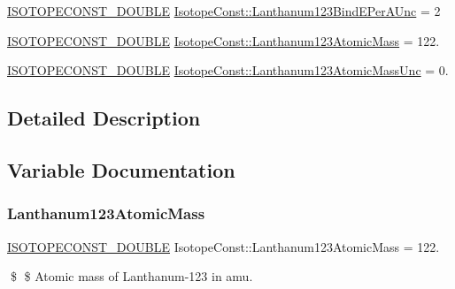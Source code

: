 \begin{DoxyCompactItemize}
\mbox{\hyperlink{group___isotope_const-_macros_ga8f45a7272ce02c0b4c65c44636ed719a}{I\+S\+O\+T\+O\+P\+E\+C\+O\+N\+S\+T\+\_\+\+D\+O\+U\+B\+LE}} \mbox{\hyperlink{group___isotope_const-_lanthanum-_la123_ga6f1ca393a390d6d6db7901b2883a7c80}{Isotope\+Const\+::\+Lanthanum123\+Bind\+E\+Per\+A\+Unc}} = 2
\item 
\mbox{\hyperlink{group___isotope_const-_macros_ga8f45a7272ce02c0b4c65c44636ed719a}{I\+S\+O\+T\+O\+P\+E\+C\+O\+N\+S\+T\+\_\+\+D\+O\+U\+B\+LE}} \mbox{\hyperlink{group___isotope_const-_lanthanum-_la123_ga54efb7b894d6e23eda2ad7463dfd226c}{Isotope\+Const\+::\+Lanthanum123\+Atomic\+Mass}} = 122.
\item 
\mbox{\hyperlink{group___isotope_const-_macros_ga8f45a7272ce02c0b4c65c44636ed719a}{I\+S\+O\+T\+O\+P\+E\+C\+O\+N\+S\+T\+\_\+\+D\+O\+U\+B\+LE}} \mbox{\hyperlink{group___isotope_const-_lanthanum-_la123_gafeb37a12347f6f5732bdbbae5d23161c}{Isotope\+Const\+::\+Lanthanum123\+Atomic\+Mass\+Unc}} = 0.
\end{DoxyCompactItemize}


\subsection{Detailed Description}


\subsection{Variable Documentation}
\mbox{\label{group___isotope_const-_lanthanum-_la123_ga54efb7b894d6e23eda2ad7463dfd226c}} 
\subsubsection{\texorpdfstring{Lanthanum123\+Atomic\+Mass}{Lanthanum123AtomicMass}}
{\footnotesize\ttfamily \mbox{\hyperlink{group___isotope_const-_macros_ga8f45a7272ce02c0b4c65c44636ed719a}{I\+S\+O\+T\+O\+P\+E\+C\+O\+N\+S\+T\+\_\+\+D\+O\+U\+B\+LE}} Isotope\+Const\+::\+Lanthanum123\+Atomic\+Mass = 122.}

\$ \$ Atomic mass of Lanthanum-\/123 in amu. \mbox{\label{group___isotope_const-_lanthanum-_la123_gafeb37a12347f6f5732bdbbae5d23161c}} 
